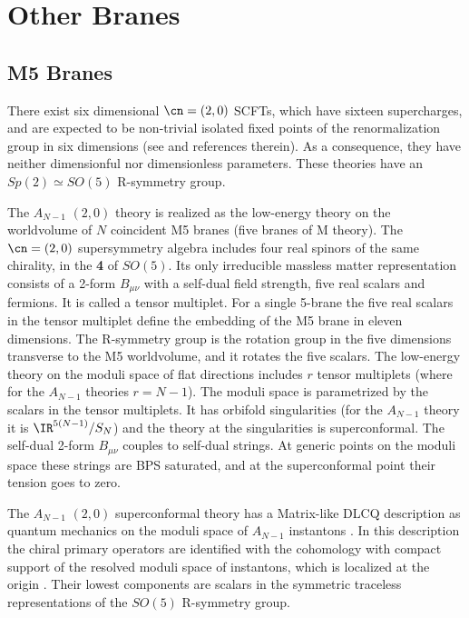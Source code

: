 
\section{Other Branes} 
\label{adsmore}

\subsection{M5 Branes}
\label{m5branes}

There exist six dimensional $\cn=(2,0)$ SCFTs, which have sixteen
supercharges, and are expected to be non-trivial isolated fixed points
of the renormalization group in six dimensions (see
\cite{Seiberg:1997ax} and references therein).  As a consequence, they
have neither dimensionful nor dimensionless parameters.  These
theories have an $Sp(2) \simeq SO(5)$ R-symmetry group.

The $A_{N-1}$ $(2,0)$ theory is realized as the low-energy theory on
the worldvolume of $N$ coincident M5 branes (five branes of M theory).
The $\cn=(2,0)$ supersymmetry algebra includes four real spinors of the
same chirality, in the {\bf 4} of $SO(5)$.  Its only irreducible
massless matter representation consists of a 2-form $B_{\mu\nu}$ with
a self-dual field strength, five real scalars and fermions. It is
called a tensor multiplet. 
For a single 5-brane the five real scalars in the tensor multiplet
define the embedding of the M5 brane in eleven dimensions.  The
R-symmetry group is the rotation group in the five dimensions
transverse to the M5 worldvolume, and it rotates the five scalars.
The low-energy theory on the moduli space
of flat directions includes $r$ tensor multiplets (where for the
$A_{N-1}$ theories $r=N-1$). The moduli space is parametrized by the
scalars in the tensor multiplets.  It has orbifold singularities (for
the $A_{N-1}$ theory it is $\IR^{5(N-1)}/S_N$) and the theory at the
singularities is superconformal.  The self-dual 2-form $B_{\mu\nu}$
couples to self-dual strings. At generic points on the moduli space
these strings are BPS saturated, and at the superconformal point their
tension goes to zero.

The $A_{N-1}$ $(2,0)$ superconformal theory has a Matrix-like DLCQ
description as quantum mechanics on the moduli space of $A_{N-1}$
instantons \cite{Aharony:1997md}.  In this description the chiral
primary operators are identified with the cohomology with compact
support of the resolved moduli space of instantons, which is localized
at the origin
\cite{Aharony:1998lc}.  Their lowest components are scalars 
in the symmetric traceless
representations of the $SO(5)$ R-symmetry group.

